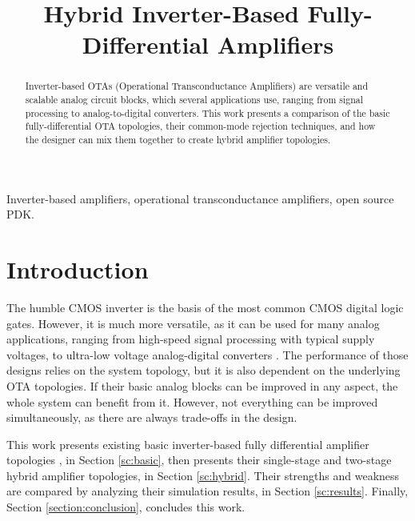 \documentclass[conference]{IEEEtran}
\begin{document}
	
	\title{Hybrid Inverter-Based Fully-Differential Amplifiers\\
	}
	
	\author{
	}
	
	\maketitle
	
	\begin{abstract}
		Inverter-based OTAs (Operational Transconductance Amplifiers) are versatile and scalable analog circuit blocks, which several applications use, ranging from signal processing to analog-to-digital converters. This work presents a comparison of the basic fully-differential OTA topologies, their common-mode rejection techniques, and how the designer can mix them together to create hybrid amplifier topologies.
	\end{abstract}
	
	\begin{IEEEkeywords}
		Inverter-based amplifiers, operational transconductance amplifiers, open source PDK.
	\end{IEEEkeywords}
	
	\section{Introduction}
	
	The humble CMOS inverter is the basis of the most common CMOS digital logic gates. However, it is much more versatile, as it can be used for many analog applications, ranging from high-speed signal processing \cite{nauta1992cmos,barthelemy2008ota} with typical supply voltages, to ultra-low voltage analog-digital converters \cite{vieru2012ultra,lv2019inverter,benvenuti2021design}. The performance of those designs relies on the system topology, but it is also dependent on the underlying OTA topologies. If their basic analog blocks can be improved in any aspect, the whole system can benefit from it. However, not everything can be improved simultaneously, as there are always trade-offs in the design.
	
	This work presents existing basic inverter-based fully differential amplifier topologies \cite{nauta1992cmos,barthelemy2008ota,vieru2011inverter,manfredini2020ultra}, in Section \ref{sc:basic}, then presents their single-stage and two-stage hybrid amplifier topologies, in Section \ref{sc:hybrid}. Their strengths and weakness are compared by analyzing their simulation results, in Section \ref{sc:results}. Finally, Section \ref{section:conclusion}, concludes this work.
	
\end{document}
